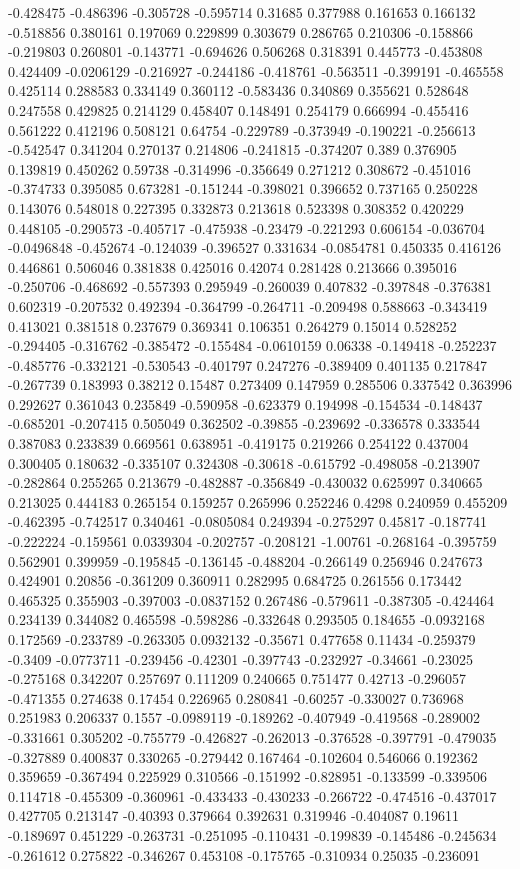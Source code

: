 -0.428475 -0.486396 -0.305728 -0.595714 0.31685 0.377988 0.161653 0.166132 -0.518856 0.380161 0.197069 0.229899 0.303679 0.286765 0.210306 -0.158866 -0.219803 0.260801 -0.143771 -0.694626 0.506268 0.318391 0.445773 -0.453808 0.424409 -0.0206129 -0.216927 -0.244186 -0.418761 -0.563511 -0.399191 -0.465558 0.425114 0.288583 0.334149 0.360112 -0.583436 0.340869 0.355621 0.528648 0.247558 0.429825 0.214129 0.458407 0.148491 0.254179 0.666994 -0.455416 0.561222 0.412196 0.508121 0.64754 -0.229789 -0.373949 -0.190221 -0.256613 -0.542547 0.341204 0.270137 0.214806 -0.241815 -0.374207 0.389 0.376905 0.139819 0.450262 0.59738 -0.314996 -0.356649 0.271212 0.308672 -0.451016 -0.374733 0.395085 0.673281 -0.151244 -0.398021 0.396652 0.737165 0.250228 0.143076 0.548018 0.227395 0.332873 0.213618 0.523398 0.308352 0.420229 0.448105 -0.290573 -0.405717 -0.475938 -0.23479 -0.221293 0.606154 -0.036704 -0.0496848 -0.452674 -0.124039 -0.396527 0.331634 -0.0854781 0.450335 0.416126 0.446861 0.506046 0.381838 0.425016 0.42074 0.281428 0.213666 0.395016 -0.250706 -0.468692 -0.557393 0.295949 -0.260039 0.407832 -0.397848 -0.376381 0.602319 -0.207532 0.492394 -0.364799 -0.264711 -0.209498 0.588663 -0.343419 0.413021 0.381518 0.237679 0.369341 0.106351 0.264279 0.15014 0.528252 -0.294405 -0.316762 -0.385472 -0.155484 -0.0610159 0.06338 -0.149418 -0.252237 -0.485776 -0.332121 -0.530543 -0.401797 0.247276 -0.389409 0.401135 0.217847 -0.267739 0.183993 0.38212 0.15487 0.273409 0.147959 0.285506 0.337542 0.363996 0.292627 0.361043 0.235849 -0.590958 -0.623379 0.194998 -0.154534 -0.148437 -0.685201 -0.207415 0.505049 0.362502 -0.39855 -0.239692 -0.336578 0.333544 0.387083 0.233839 0.669561 0.638951 -0.419175 0.219266 0.254122 0.437004 0.300405 0.180632 -0.335107 0.324308 -0.30618 -0.615792 -0.498058 -0.213907 -0.282864 0.255265 0.213679 -0.482887 -0.356849 -0.430032 0.625997 0.340665 0.213025 0.444183 0.265154 0.159257 0.265996 0.252246 0.4298 0.240959 0.455209 -0.462395 -0.742517 0.340461 -0.0805084 0.249394 -0.275297 0.45817 -0.187741 -0.222224 -0.159561 0.0339304 -0.202757 -0.208121 -1.00761 -0.268164 -0.395759 0.562901 0.399959 -0.195845 -0.136145 -0.488204 -0.266149 0.256946 0.247673 0.424901 0.20856 -0.361209 0.360911 0.282995 0.684725 0.261556 0.173442 0.465325 0.355903 -0.397003 -0.0837152 0.267486 -0.579611 -0.387305 -0.424464 0.234139 0.344082 0.465598 -0.598286 -0.332648 0.293505 0.184655 -0.0932168 0.172569 -0.233789 -0.263305 0.0932132 -0.35671 0.477658 0.11434 -0.259379 -0.3409 -0.0773711 -0.239456 -0.42301 -0.397743 -0.232927 -0.34661 -0.23025 -0.275168 0.342207 0.257697 0.111209 0.240665 0.751477 0.42713 -0.296057 -0.471355 0.274638 0.17454 0.226965 0.280841 -0.60257 -0.330027 0.736968 0.251983 0.206337 0.1557 -0.0989119 -0.189262 -0.407949 -0.419568 -0.289002 -0.331661 0.305202 -0.755779 -0.426827 -0.262013 -0.376528 -0.397791 -0.479035 -0.327889 0.400837 0.330265 -0.279442 0.167464 -0.102604 0.546066 0.192362 0.359659 -0.367494 0.225929 0.310566 -0.151992 -0.828951 -0.133599 -0.339506 0.114718 -0.455309 -0.360961 -0.433433 -0.430233 -0.266722 -0.474516 -0.437017 0.427705 0.213147 -0.40393 0.379664 0.392631 0.319946 -0.404087 0.19611 -0.189697 0.451229 -0.263731 -0.251095 -0.110431 -0.199839 -0.145486 -0.245634 -0.261612 0.275822 -0.346267 0.453108 -0.175765 -0.310934 0.25035 -0.236091 